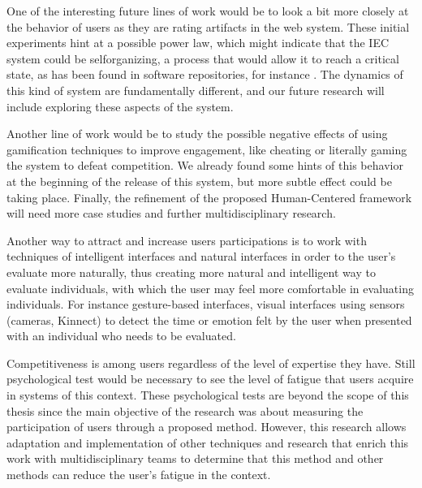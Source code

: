 One of the interesting future lines of work would be to look a bit more closely at the
behavior of users as they are rating artifacts in the web system. These initial
experiments hint at a possible power law, which might indicate that the IEC
system could be selforganizing, a process that would allow it to reach a
critical state, as has been found in software repositories, for instance \cite{merelo2016self}.
The dynamics of this kind of system are fundamentally different, and our future
research will include exploring these aspects of the system.

Another line of work would be to study the possible negative effects of using gamification
techniques to improve engagement, like cheating or literally gaming the system
to defeat competition. We already found some hints of this behavior at the
beginning of the release of this system, but more subtle effect could be taking
place. Finally, the refinement of the proposed Human-Centered framework will
need more case studies and further multidisciplinary research.

Another way to attract and increase user\’s participations is to work with
techniques of intelligent interfaces and natural interfaces in order to the
user's evaluate more naturally, thus creating more natural and intelligent way
to evaluate individuals, with which the user may feel more comfortable in
evaluating individuals. For instance  gesture-based interfaces, visual
interfaces using sensors (cameras, Kinnect) to detect the time or emotion felt
by the user when presented with an individual who needs to be evaluated.

Competitiveness is among users regardless of the level of expertise they have.
Still psychological test would be necessary to see the level of fatigue that
users acquire in systems of this context. These psychological tests are beyond
the scope of this thesis since the main objective of the research was about
measuring the participation of users through a proposed method. However, this
research allows adaptation and implementation of other techniques and research
that enrich this work with multidisciplinary teams to determine that this method
and other methods can reduce the user's fatigue in the context.

